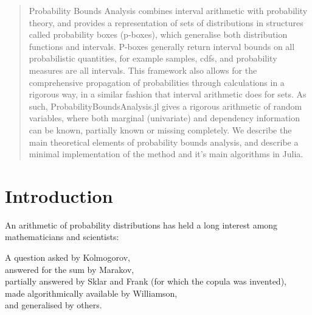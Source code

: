 \documentclass{juliacon}
\begin{document}


\maketitle

\begin{abstract}

Probability Bounds Analysis combines interval arithmetic with probability theory, and provides a representation of sets of distributions in structures called probability boxes (p-boxes), which generalise both distribution functions and intervals. P-boxes generally return interval bounds on all probabilistic quantities, for example samples, cdfs, and probability measures are all intervals. This framework also allows for the comprehensive propagation of probabilities through calculations in a rigorous way, in a similar fashion that interval arithmetic does for sets. As such, ProbabilityBoundsAnalysis.jl gives a rigorous arithmetic of random variables, where both marginal (univariate) and dependency information can be known, partially known or missing completely. We describe the main theoretical elements of probability bounds analysis, and describe a minimal implementation of the method and it's main algorithms in Julia.

\end{abstract}

\section{Introduction}
\label{sec:intro}


An arithmetic of probability distributions has held a long interest among mathematicians and scientists:
\begin{displayquote}
  A question asked by Kolmogorov, \\
  answered for the sum by Marakov, \\
  partially answered by Sklar and Frank (for which the copula was invented),\\
  made algorithmically available by Williamson, \\
  and generalised by others.
\end{displayquote}
\end{document}
